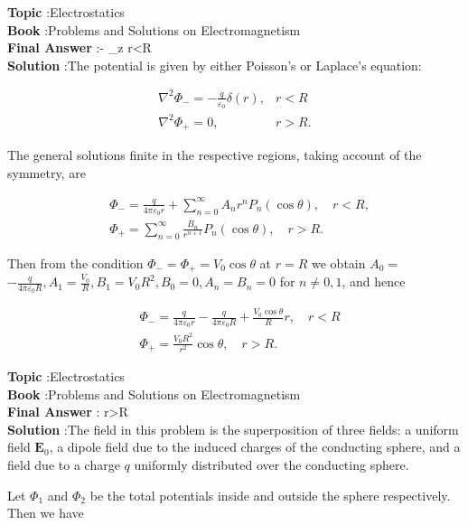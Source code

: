 \documentclass[10pt]{article}
\begin{document}
\textbf{Topic} :Electrostatics\\
\textbf{Book} :Problems and Solutions on Electromagnetism\\
\textbf{Final Answer} :- _{z} \quad r<R\\


\textbf{Solution} :The potential is given by either Poisson's or Laplace's equation:

$$
\begin{array}{ll}
\nabla^{2} \Phi_{-}=-\frac{q}{\varepsilon_{0}} \delta(r), & r<R \\
\nabla^{2} \Phi_{+}=0, & r>R .
\end{array}
$$

The general solutions finite in the respective regions, taking account of the symmetry, are

$$
\begin{aligned}
&\Phi_{-}=\frac{q}{4 \pi \varepsilon_{0} r}+\sum_{n=0}^{\infty} A_{n} r^{n} P_{n}(\cos \theta), \quad r<R, \\
&\Phi_{+}=\sum_{n=0}^{\infty} \frac{B_{n}}{r^{n+1}} P_{n}(\cos \theta), \quad r>R .
\end{aligned}
$$

Then from the condition $\Phi_{-}=\Phi_{+}=V_{0} \cos \theta$ at $r=R$ we obtain $A_{0}=$ $-\frac{q}{4 \pi \varepsilon_{0} R}, A_{1}=\frac{V_{0}}{R}, B_{1}=V_{0} R^{2}, B_{0}=0, A_{n}=B_{n}=0$ for $n \neq 0,1$, and hence

$$
\begin{aligned}
&\Phi_{-}=\frac{q}{4 \pi \varepsilon_{0} r}-\frac{q}{4 \pi \varepsilon_{0} R}+\frac{V_{0} \cos \theta}{R} r, \quad r<R \\
&\Phi_{+}=\frac{V_{0} R^{2}}{r^{2}} \cos \theta, \quad r>R .
\end{aligned}
$$

\textbf{Topic} :Electrostatics\\
\textbf{Book} :Problems and Solutions on Electromagnetism\\
\textbf{Final Answer} : \cos \theta \quad r>R\\


\textbf{Solution} :The field in this problem is the superposition of three fields: a uniform field $\mathbf{E}_{0}$, a dipole field due to the induced charges of the conducting sphere, and a field due to a charge $q$ uniformly distributed over the conducting sphere.

Let $\Phi_{1}$ and $\Phi_{2}$ be the total potentials inside and outside the sphere respectively. Then we have
\end{document}
